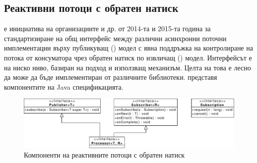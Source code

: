 \subsection{Реактивни потоци с обратен натиск}
\label{sec:reactive-streams-with-backpressure}

 \cite{reactiveStreamsSpecification2015} е инициатива на организациите  и др. от 2014-та и 2015-та година за стандартизиране на общ интерфейс между различни асинхронни поточни имплементации върху публикуващ () модел с явна поддръжка на контролиране на потока от консуматора чрез обратен натиск по извличащ () модел. Интерфейсът е на ниско ниво, базиран на  подход и използващ  механизъм. Целта на това е лесно да може да бъде имплементиран от различните библиотеки.  представя компонентите на Java спецификацията.

\begin{figure}
  \centering\includegraphics[width=\textwidth]{images/reactive-streams.pdf}
  \caption{Компоненти на реактивните потоци с обратен натиск}
  \label{fig:reactive-streams}
\end{figure}

